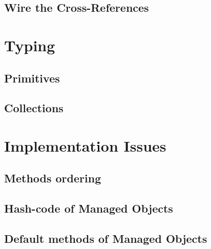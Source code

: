 \subsection{Wire the Cross-References}\label{subsec:Schema Loading Wire the Cross-References}

\section{Typing}\label{sec:Implementation Typing}

\subsection{Primitives}\label{subsec:Typing Primitives}

\subsection{Collections}\label{subsec:Typing Collections}

\section{Implementation Issues}\label{sec:Implementation Issues}

\subsection{Methods ordering}\label{subsec:Methods ordering}

\subsection{Hash-code of Managed Objects}\label{subsec:Hashcode of Managed Objects}

\subsection{Default methods of Managed Objects}\label{subsec:Default methods of Managed Objects}

